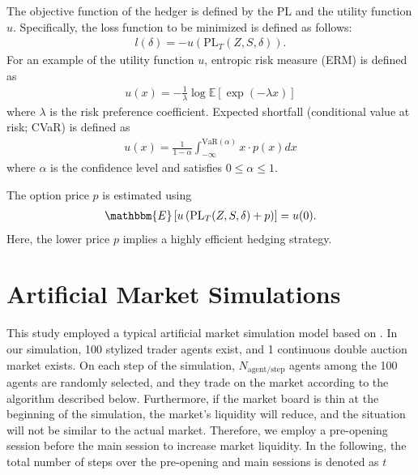 The objective function of the hedger is defined by the PL and the utility function $u$.
Specifically, the loss function to be minimized is defined as follows:
\begin{eqnarray}
    l(\delta) = - u \left(\mathrm{PL}_T(Z, S, \delta)\right).
\end{eqnarray}
For an example of the utility function $u$, entropic risk measure (ERM) is defined as
\begin{eqnarray}
    u(x) = -\frac{1}{\lambda}\log\mathbb{E}\left[\exp{(-\lambda x)}\right]\label{eq:erm}
\end{eqnarray}
where $\lambda$ is the risk preference coefficient.
Expected shortfall (conditional value at risk; CVaR) is defined as
\begin{eqnarray}
    u(x) = \frac{1}{1-\alpha} \int_{-\infty}^{\mathrm{VaR}(\alpha)} x\cdot p(x)dx\label{eq:cvar}
\end{eqnarray}
where $\alpha$ is the confidence level and satisfies $0\leq\alpha\leq 1$.

The option price $p$ is estimated using
\begin{eqnarray}
    \mathbbm{E}\left[u \left(\mathrm{PL}_T(Z, S, \delta) + p\right)\right] = u(0).
\end{eqnarray}
Here, the lower price $p$ implies a highly efficient hedging strategy.

\section{Artificial Market Simulations}
This study employed a typical artificial market simulation model based on \cite{Torii2015}.
In our simulation, 100 stylized trader agents exist, and 1 continuous double auction market exists.
On each step of the simulation, $N_{\mathrm{agent/step}}$ agents among the 100 agents are randomly selected, and they trade on the market according to the algorithm described below.
Furthermore, if the market board is thin at the beginning of the simulation, the market's liquidity will reduce, and the situation will not be similar to the actual market.
Therefore, we employ a pre-opening session before the main session to increase market liquidity.
In the following, the total number of steps over the pre-opening and main sessions is denoted as $t$

